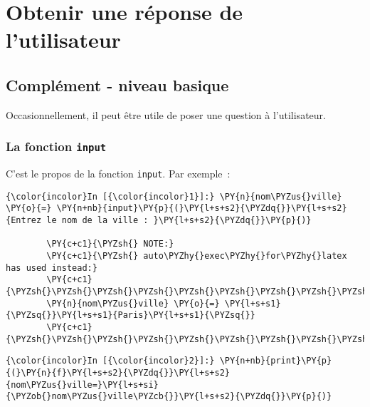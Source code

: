     
    
    
    

    

    \hypertarget{obtenir-une-ruxe9ponse-de-lutilisateur}{%
\section{Obtenir une réponse de
l'utilisateur}\label{obtenir-une-ruxe9ponse-de-lutilisateur}}

    \hypertarget{compluxe9ment---niveau-basique}{%
\subsection{Complément - niveau
basique}\label{compluxe9ment---niveau-basique}}

    Occasionnellement, il peut être utile de poser une question à
l'utilisateur.

    \hypertarget{la-fonction-input}{%
\subsubsection{\texorpdfstring{La fonction
\texttt{input}}{La fonction input}}\label{la-fonction-input}}

    C'est le propos de la fonction \texttt{input}. Par exemple~:

    \begin{Verbatim}[commandchars=\\\{\},frame=single,framerule=0.3mm,rulecolor=\color{cellframecolor}]
{\color{incolor}In [{\color{incolor}1}]:} \PY{n}{nom\PYZus{}ville} \PY{o}{=} \PY{n+nb}{input}\PY{p}{(}\PY{l+s+s2}{\PYZdq{}}\PY{l+s+s2}{Entrez le nom de la ville : }\PY{l+s+s2}{\PYZdq{}}\PY{p}{)}
        
        \PY{c+c1}{\PYZsh{} NOTE:}
        \PY{c+c1}{\PYZsh{} auto\PYZhy{}exec\PYZhy{}for\PYZhy{}latex has used instead:}
        \PY{c+c1}{\PYZsh{}\PYZsh{}\PYZsh{}\PYZsh{}\PYZsh{}\PYZsh{}\PYZsh{}\PYZsh{}\PYZsh{}\PYZsh{}}
        \PY{n}{nom\PYZus{}ville} \PY{o}{=} \PY{l+s+s1}{\PYZsq{}}\PY{l+s+s1}{Paris}\PY{l+s+s1}{\PYZsq{}}
        \PY{c+c1}{\PYZsh{}\PYZsh{}\PYZsh{}\PYZsh{}\PYZsh{}\PYZsh{}\PYZsh{}\PYZsh{}\PYZsh{}\PYZsh{}}
\end{Verbatim}


    \begin{Verbatim}[commandchars=\\\{\},frame=single,framerule=0.3mm,rulecolor=\color{cellframecolor}]
{\color{incolor}In [{\color{incolor}2}]:} \PY{n+nb}{print}\PY{p}{(}\PY{n}{f}\PY{l+s+s2}{\PYZdq{}}\PY{l+s+s2}{nom\PYZus{}ville=}\PY{l+s+si}{\PYZob{}nom\PYZus{}ville\PYZcb{}}\PY{l+s+s2}{\PYZdq{}}\PY{p}{)}
\end{Verbatim}


